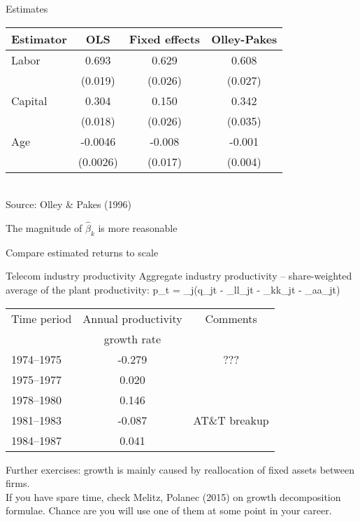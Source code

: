 \begin{frame}{Estimates}
	\begin{center}
	\begin{tabular}{|l|ccc|}\hline
		Estimator & OLS	& Fixed effects	& Olley-Pakes\\\hline
		Labor 	& 0.693	& 0.629 			& 0.608\\
				& (0.019)	& (0.026) 		& (0.027)\\
		Capital	& 0.304	&  0.150 			& 0.342\\
				& (0.018)	&  (0.026) 		& (0.035)\\
		Age		& -0.0046 & -0.008			& -0.001\\
				& (0.0026)& (0.017)			& (0.004)\\\hline
	\end{tabular}\\
	{\footnotesize{}Source: Olley \& Pakes (1996)}
	\end{center}
	\bi
		\item{The magnitude of $\widehat{\beta}_k$ is more reasonable}
		\item{Compare estimated returns to scale}
	\ei	
\end{frame}

\begin{frame}{Telecom industry productivity}
	Aggregate industry productivity -- share-weighted average of the plant productivity:
	\be
		p_t = \sum_j\exp(q_{jt} - \widehat{\beta}_ll_{jt} - \widehat{\beta}_kk_{jt} - \widehat{\beta}_aa_{jt})
	\ee
	\begin{center}
	\begin{tabular}{|l|c|c|}\hline
		Time period 	& Annual productivity & Comments\\
					& growth rate &\\\hline
		1974--1975	& -0.279	& ???\\
		1975--1977	& 0.020 	&\\
		1978--1980	& 0.146 	&\\
		1981--1983	& -0.087	& AT\&T breakup\\
		1984--1987	& 0.041	&\\\hline
	\end{tabular}
	\end{center}
	Further exercises: growth is mainly caused by reallocation of fixed assets between firms.\\
	
	If you have spare time, check Melitz, Polanec (2015) on growth decomposition formulae. Chance are you will use one of them at some point in your career.
\end{frame}